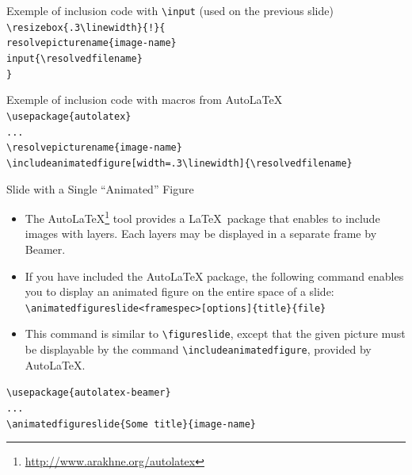 \documentclass[english,sectioncirclenumberstyle]{ciadbeamer}
\begin{document}
\begin{frame}{Exemple of inclusion code with \texttt{{\textbackslash}input} (used on the previous slide)}
	\texttt{{\textbackslash}resizebox\{.3{\textbackslash}linewidth\}\{!\}\{} \\
	\texttt{\hspace{.5cm}{\textbackslash}resolvepicturename\{image-name\}} \\
	\texttt{\hspace{.5cm}{\textbackslash}input\{{\textbackslash}resolvedfilename\}} \\
	\texttt{\}}
\end{frame}

\begin{frame}{Exemple of inclusion code with macros from AutoLaTeX}
	\texttt{{\textbackslash}usepackage\{autolatex\}} \\
	\vspace{.5cm}
	\texttt{...} \\
	\vspace{.5cm}
	\texttt{{\textbackslash}resolvepicturename\{image-name\}} \\
	\texttt{{\textbackslash}includeanimatedfigure[width=.3{\textbackslash}linewidth]\{{\textbackslash}resolvedfilename\}}
\end{frame}

\begin{frame}{Slide with a Single ``Animated'' Figure}
	\begin{itemize}
	\item The AutoLaTeX\footnote{\url{http://www.arakhne.org/autolatex}} tool provides a \LaTeX\ package that enables to include images with layers. Each layers may be displayed in a separate frame by Beamer.
	\vfill
	\item If you have included the AutoLaTeX package, the following command enables you to display an animated figure on the entire space of a slide: \\
		\texttt{{\textbackslash}animatedfigureslide<framespec>[options]\{title\}\{file\}}
	\item This command is similar to \texttt{{\textbackslash}figureslide}, except that the given picture must be displayable by the command \texttt{{\textbackslash}includeanimatedfigure}, provided by AutoLaTeX.
	\end{itemize}
	\vspace{.5cm}
	\texttt{{\textbackslash}usepackage\{autolatex-beamer\}} \\
	\vspace{.25cm}
	\texttt{...} \\
	\vspace{.25cm}
	\texttt{{\textbackslash}animatedfigureslide\{Some title\}\{image-name\}}
\end{frame}
\end{document}
